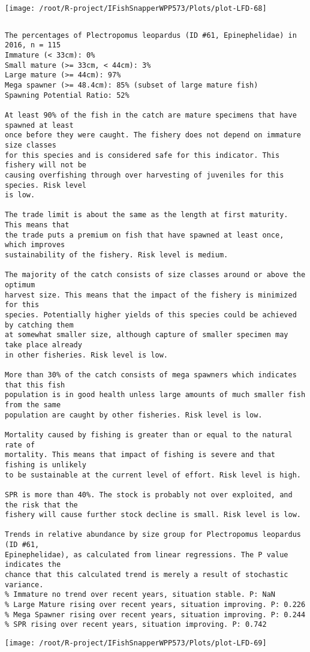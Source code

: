 \documentclass{report}\usepackage[]{graphicx}\usepackage[]{color}
\makeatletter
\def\maxwidth{ %
  \ifdim\Gin@nat@width>\linewidth
    \linewidth
  \else
    \Gin@nat@width
  \fi
}
\newenvironment{kframe}{%
 \def\at@end@of@kframe{}%
 \ifinner\ifhmode%
  \def\at@end@of@kframe{\end{minipage}}%
  \begin{minipage}{\columnwidth}%
 \fi\fi%
 \def\FrameCommand##1{\hskip\@totalleftmargin \hskip-\fboxsep
 \colorbox{shadecolor}{##1}\hskip-\fboxsep
     \hskip-\linewidth \hskip-\@totalleftmargin \hskip\columnwidth}%
 \MakeFramed {\advance\hsize-\width
   \@totalleftmargin\z@ \linewidth\hsize
   \@setminipage}}%
 {\par\unskip\endMakeFramed%
 \at@end@of@kframe}
\newenvironment{knitrout}{}{} %
\makeatother
\begin{document}
\begin{knitrout}
\texttt{[image: /root/R-project/IFishSnapperWPP573/Plots/plot-LFD-68]} 
\begin{kframe}\begin{verbatim}
\end{verbatim}
\end{kframe}
\clearpage
\newpage
\begin{kframe}\begin{verbatim}The percentages of Plectropomus leopardus (ID #61, Epinephelidae) in 2016, n = 115
Immature (< 33cm): 0%
Small mature (>= 33cm, < 44cm): 3%
Large mature (>= 44cm): 97%
Mega spawner (>= 48.4cm): 85% (subset of large mature fish)
Spawning Potential Ratio: 52%
 
At least 90% of the fish in the catch are mature specimens that have spawned at least
once before they were caught. The fishery does not depend on immature size classes
for this species and is considered safe for this indicator. This fishery will not be
causing overfishing through over harvesting of juveniles for this species. Risk level
is low.

The trade limit is about the same as the length at first maturity.  This means that
the trade puts a premium on fish that have spawned at least once, which improves
sustainability of the fishery. Risk level is medium.

The majority of the catch consists of size classes around or above the optimum
harvest size. This means that the impact of the fishery is minimized for this
species. Potentially higher yields of this species could be achieved by catching them
at somewhat smaller size, although capture of smaller specimen may take place already
in other fisheries. Risk level is low.

More than 30% of the catch consists of mega spawners which indicates that this fish
population is in good health unless large amounts of much smaller fish from the same
population are caught by other fisheries. Risk level is low.
 
Mortality caused by fishing is greater than or equal to the natural rate of
mortality. This means that impact of fishing is severe and that fishing is unlikely
to be sustainable at the current level of effort. Risk level is high.
 
SPR is more than 40%. The stock is probably not over exploited, and the risk that the
fishery will cause further stock decline is small. Risk level is low.
 
Trends in relative abundance by size group for Plectropomus leopardus (ID #61,
Epinephelidae), as calculated from linear regressions. The P value indicates the
chance that this calculated trend is merely a result of stochastic variance.
% Immature no trend over recent years, situation stable. P: NaN
% Large Mature rising over recent years, situation improving. P: 0.226
% Mega Spawner rising over recent years, situation improving. P: 0.244
% SPR rising over recent years, situation improving. P: 0.742
\end{verbatim}
\end{kframe}
\texttt{[image: /root/R-project/IFishSnapperWPP573/Plots/plot-LFD-69]} 


\end{knitrout}
\end{document}
